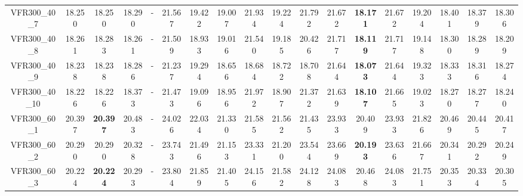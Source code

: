 \begin{tabular}{cc|ccc|ccccccccccccc}
VFR300\_40\_7      & 18.250           & 18.250           & 18.290           & -                & 21.567           & 19.422           & 19.007           & 21.934           & 19.224           & 21.792           & 21.672           & {\bf 18.171}     & 21.672           & 19.204           & 18.401           & 18.379           & 18.306          \\ 
VFR300\_40\_8      & 18.261           & 18.283           & 18.261           & -                & 21.509           & 18.933           & 19.016           & 21.540           & 19.185           & 20.426           & 21.717           & {\bf 18.119}     & 21.717           & 19.148           & 18.300           & 18.289           & 18.209          \\ 
VFR300\_40\_9      & 18.238           & 18.238           & 18.286           & -                & 21.237           & 19.294           & 18.656           & 18.684           & 18.722           & 18.708           & 21.644           & {\bf 18.073}     & 21.644           & 19.323           & 18.333           & 18.316           & 18.274          \\ 
VFR300\_40\_10     & 18.226           & 18.226           & 18.373           & -                & 21.473           & 19.096           & 18.956           & 21.972           & 18.907           & 21.372           & 21.639           & {\bf 18.107}     & 21.665           & 19.023           & 18.270           & 18.277           & 18.240          \\ 
VFR300\_60\_1      & 20.397           & {\bf 20.397}     & 20.483           & -                & 24.026           & 22.034           & 21.330           & 21.585           & 21.562           & 21.435           & 23.933           & 20.409           & 23.933           & 21.826           & 20.469           & 20.445           & 20.417          \\ 
VFR300\_60\_2      & 20.290           & 20.290           & 20.328           & -                & 23.743           & 21.496           & 21.153           & 23.331           & 21.200           & 23.544           & 23.669           & {\bf 20.193}     & 23.636           & 21.667           & 20.341           & 20.292           & 20.249          \\ 
VFR300\_60\_3      & 20.224           & {\bf 20.224}     & 20.293           & -                & 23.804           & 21.859           & 21.405           & 24.156           & 21.582           & 24.128           & 24.083           & 20.468           & 24.083           & 21.751           & 20.353           & 20.334           & 20.305          \\ 

\end{tabular}
